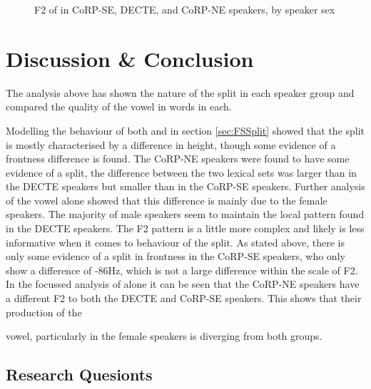 \documentclass[../../../00.FullDoc/tex/ThesisSkeleton-draft2]{subfiles}
\begin{document}
\begin{figure}[h]
	
	\caption{F2 of \strutt{} in CoRP-SE, DECTE, and CoRP-NE speakers, by speaker sex} \label{fig:strutF2-sex}
\end{figure}

\section{Discussion \& Conclusion}
The analysis above has shown the nature of the \FS{} split in each speaker group and compared the quality of the vowel in \strutt{} words in each.

Modelling the behaviour of both \foot{} and \strutt{} in section \ref{sec:FSSplit} showed that the \FS{} split is mostly characterised by a difference in height, though some evidence of a frontness difference is found. The CoRP-NE speakers were found to have some evidence of a \FS{} split, the difference between the two lexical sets was larger than in the DECTE speakers but smaller than in the CoRP-SE speakers. Further analysis of the \strutt{} vowel alone showed that this difference is mainly due to the female speakers. The majority of male speakers seem to maintain the local pattern found in the DECTE speakers. The F2 pattern is a little more complex and likely is less informative when it comes to behaviour of the \FS{} split. As stated above, there is only some evidence of a split in frontness in the CoRP-SE speakers, who only show a difference of -86Hz, which is not a large difference within the scale of F2. In the focussed analysis of \strutt{} alone it can be seen that the CoRP-NE speakers have a different F2 to both the DECTE and CoRP-SE speakers. This shows that their production of the \strut{} vowel, particularly in the female speakers is diverging from both groups.

\subsection{Research Quesionts}
\end{document}
